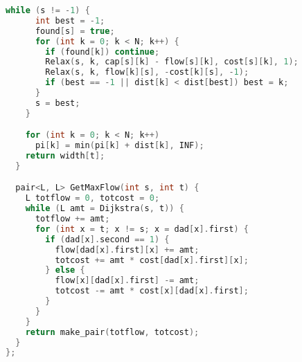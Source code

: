 \begin{lstlisting}[language=C++]
    while (s != -1) {
      int best = -1;
      found[s] = true;
      for (int k = 0; k < N; k++) {
        if (found[k]) continue;
        Relax(s, k, cap[s][k] - flow[s][k], cost[s][k], 1);
        Relax(s, k, flow[k][s], -cost[k][s], -1);
        if (best == -1 || dist[k] < dist[best]) best = k;
      }
      s = best;
    }

    for (int k = 0; k < N; k++)
      pi[k] = min(pi[k] + dist[k], INF);
    return width[t];
  }

  pair<L, L> GetMaxFlow(int s, int t) {
    L totflow = 0, totcost = 0;
    while (L amt = Dijkstra(s, t)) {
      totflow += amt;
      for (int x = t; x != s; x = dad[x].first) {
        if (dad[x].second == 1) {
          flow[dad[x].first][x] += amt;
          totcost += amt * cost[dad[x].first][x];
        } else {
          flow[x][dad[x].first] -= amt;
          totcost -= amt * cost[x][dad[x].first];
        }
      }
    }
    return make_pair(totflow, totcost);
  }
};

\end{lstlisting}
